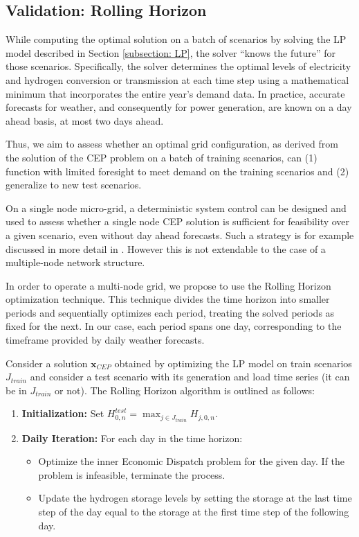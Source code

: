 \documentclass[smallextended,natbib]{svjour3}       %
\numberwithin{definition}{section}
\numberwithin{theorem}{section}
\numberwithin{proposition}{section}
\begin{document}
\subsection{Validation: Rolling Horizon}\label{subsection: RH}

While computing the optimal solution on a batch of scenarios by solving the LP model described in Section \ref{subsection: LP}, the solver ``knows the future'' for those scenarios.
Specifically, the solver determines the optimal levels of electricity and hydrogen conversion or transmission at each time step using a mathematical minimum that incorporates the entire year's demand data.
In practice, accurate forecasts for weather, and consequently for power generation, are known on a day ahead basis, at most two days ahead.

Thus, we aim to assess whether an optimal grid configuration, as derived from the solution of the CEP problem on a batch of training scenarios, can (1) function with limited foresight to meet demand on the training scenarios and (2) generalize to new test scenarios.

On a single node micro-grid, a deterministic system control can be designed and used to assess whether a single node CEP solution is sufficient for feasibility over a given scenario, even without day ahead forecasts. 
Such a strategy is for example discussed in more detail in \cite{deterministic}.
However this is not extendable to the case of a multiple-node network structure.

In order to operate a multi-node grid, we propose to use the Rolling Horizon optimization technique. 
This technique divides the time horizon into smaller periods and sequentially optimizes each period, treating the solved periods as fixed for the next. 
In our case, each period spans one day, corresponding to the timeframe provided by daily weather forecasts.


Consider a solution $\mathbf{x}_{CEP}$ obtained by optimizing the LP model on train scenarios $J_{train}$ and consider a test scenario with its generation and load time series (it can be in $J_{train}$ or not). The Rolling Horizon algorithm is outlined as follows:
\begin{enumerate}
  \item \textbf{Initialization:} Set \( H_{0,n}^{test} = \max_{j \in J_{train}} H_{j,0,n} \).
  
  \item \textbf{Daily Iteration:} For each day in the time horizon:
  \begin{itemize}
      \item Optimize the inner Economic Dispatch problem for the given day. If the problem is infeasible, terminate the process.
      \item Update the hydrogen storage levels by setting the storage at the last time step of the day equal to the storage at the first time step of the following day.
  \end{itemize}
\end{enumerate}
\end{document}

